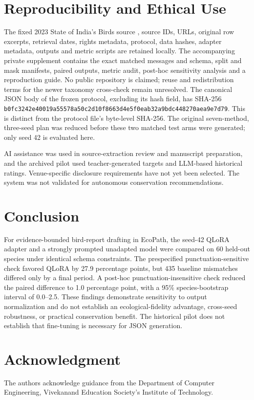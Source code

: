 \documentclass[a4paper,conference,10pt]{IEEEtran}
\begin{document}
\section{Reproducibility and Ethical Use}
The fixed 2023 State of India's Birds source \cite{soib}, source IDs, URLs, original row excerpts, retrieval dates, rights metadata, protocol, data hashes, adapter metadata, outputs and metric scripts are retained locally. The accompanying private supplement contains the exact matched messages and schema, split and mask manifests, paired outputs, metric audit, post-hoc sensitivity analysis and a reproduction guide. No public repository is claimed; reuse and redistribution terms for the newer taxonomy cross-check remain unresolved. The canonical JSON body of the frozen protocol, excluding its hash field, has SHA-256 \texttt{b0fc3242e40019a5\allowbreak 5578a50c2d10f866\allowbreak 3d4e5f0eab32a9bd\allowbreak c448270aea9e7d79}. This is distinct from the protocol file's byte-level SHA-256. The original seven-method, three-seed plan was reduced before these two matched test arms were generated; only seed 42 is evaluated here.

AI assistance was used in source-extraction review and manuscript preparation, and the archived pilot used teacher-generated targets and LLM-based historical ratings. Venue-specific disclosure requirements have not yet been selected. The system was not validated for autonomous conservation recommendations.

\section{Conclusion}
For evidence-bounded bird-report drafting in EcoPath, the seed-42 QLoRA adapter and a strongly prompted unadapted model were compared on 60 held-out species under identical schema constraints. The prespecified punctuation-sensitive check favored QLoRA by 27.9 percentage points, but 435 baseline mismatches differed only by a final period. A post-hoc punctuation-insensitive check reduced the paired difference to 1.0 percentage point, with a 95\% species-bootstrap interval of 0.0--2.5. These findings demonstrate sensitivity to output normalization and do not establish an ecological-fidelity advantage, cross-seed robustness, or practical conservation benefit. The historical pilot does not establish that fine-tuning is necessary for JSON generation.

\section*{Acknowledgment}
The authors acknowledge guidance from the Department of Computer Engineering, Vivekanand Education Society's Institute of Technology.
\end{document}
